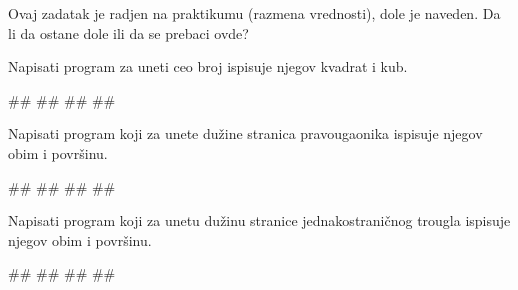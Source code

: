 \begin{Exercise}[label=v1.1_10] 
Ovaj zadatak je radjen na praktikumu (razmena vrednosti), dole je naveden. Da li da ostane dole ili da se prebaci ovde?
\end{Exercise}
\begin{Answer}[ref=v1.1_10]
\end{Answer}




\begin{Exercise}[label=p1_01] 
Napisati program za uneti ceo broj ispisuje njegov kvadrat i kub. \\
\begin{miditest}
\begin{upotreba}{1}
#\naslovInt#
##
##
##
\end{upotreba}
\end{miditest}
\end{Exercise}
\begin{Answer}[ref=p1_01]
\end{Answer}

\begin{Exercise}[label=p1_02] 
Napisati program koji za unete dužine stranica pravougaonika ispisuje njegov obim i površinu.\\
\begin{miditest}
\begin{upotreba}{1}
#\naslovInt#
##
##
##
\end{upotreba}
\end{miditest}
\end{Exercise}
\begin{Answer}[ref=p1_02]
\end{Answer}


\begin{Exercise}[label=p1_03] 
Napisati program koji za unetu dužinu stranice jednakostraničnog trougla ispisuje njegov obim i površinu.\\
\begin{miditest}
\begin{upotreba}{1}
#\naslovInt#
##
##
##
\end{upotreba}
\end{miditest}
\end{Exercise}
\begin{Answer}[ref=p1_03]
\end{Answer}


